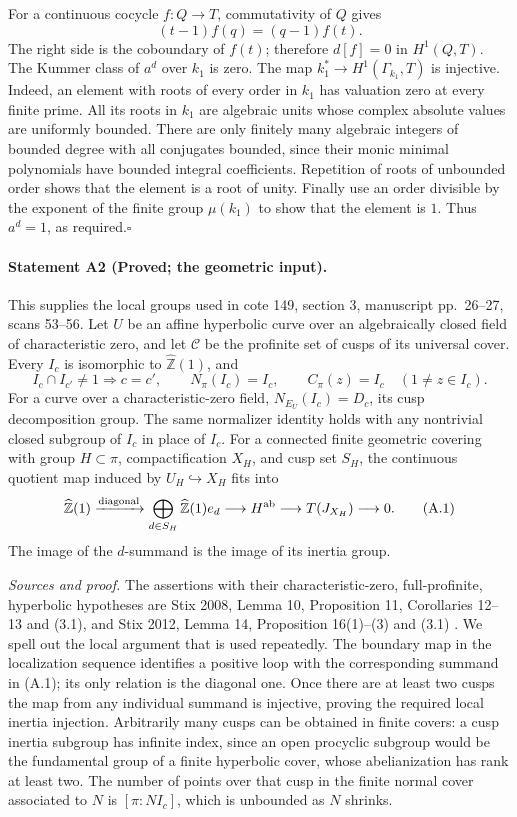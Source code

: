 For a continuous cocycle $f:Q\to T$, commutativity of $Q$ gives
\[
 (t-1)f(q)=(q-1)f(t).
\]
The right side is the coboundary of $f(t)$; therefore $d[f]=0$ in $H^1(Q,T)$. The Kummer class of $a^d$ over $k_1$ is zero. The map $k_1^*\to H^1(\Gamma_{k_1},T)$ is injective. Indeed, an element with roots of every order in $k_1$ has valuation zero at every finite prime. All its roots in $k_1$ are algebraic units whose complex absolute values are uniformly bounded. There are only finitely many algebraic integers of bounded degree with all conjugates bounded, since their monic minimal polynomials have bounded integral coefficients. Repetition of roots of unbounded order shows that the element is a root of unity. Finally use an order divisible by the exponent of the finite group $\mu(k_1)$ to show that the element is $1$. Thus $a^d=1$, as required.\hfill$\square$

\paragraph{Statement A2 (Proved; the geometric input).}\label{res:A2}
This supplies the local groups used in cote 149, section 3, manuscript pp.~26--27, scans 53--56.
Let $U$ be an affine hyperbolic curve over an algebraically closed field of characteristic zero, and let $\mathcal C$ be the profinite set of cusps of its universal cover. Every $I_c$ is isomorphic to $\widehat{\mathbb Z}(1)$, and
\[
 I_c\cap I_{c'}\ne1\Longrightarrow c=c',\qquad
 N_\pi(I_c)=I_c,\qquad C_\pi(z)=I_c\quad(1\ne z\in I_c).
\]
For a curve over a characteristic-zero field, $N_{E_U}(I_c)=D_c$, its cusp decomposition group. The same normalizer identity holds with any nontrivial closed subgroup of $I_c$ in place of $I_c$. For a connected finite geometric covering with group $H\subset\pi$, compactification $X_H$, and cusp set $S_H$, the continuous quotient map induced by $U_H\hookrightarrow X_H$ fits into
\[
 \widehat{\mathbb Z}(1)\xrightarrow{\rm diagonal}
 \bigoplus_{d\in S_H}\widehat{\mathbb Z}(1)e_d
 \longrightarrow H^{\rm ab}\longrightarrow T(J_{X_H})\longrightarrow0.\tag{A.1}
\]
The image of the $d$-summand is the image of its inertia group.

\emph{Sources and proof.} The assertions with their characteristic-zero, full-profinite, hyperbolic hypotheses are Stix 2008, Lemma 10, Proposition 11, Corollaries 12--13 and (3.1), and Stix 2012, Lemma 14, Proposition 16(1)--(3) and (3.1) \cite{Stix2008,Stix2012}. We spell out the local argument that is used repeatedly. The boundary map in the localization sequence identifies a positive loop with the corresponding summand in (A.1); its only relation is the diagonal one. Once there are at least two cusps the map from any individual summand is injective, proving the required local inertia injection. Arbitrarily many cusps can be obtained in finite covers: a cusp inertia subgroup has infinite index, since an open procyclic subgroup would be the fundamental group of a finite hyperbolic cover, whose abelianization has rank at least two. The number of points over that cusp in the finite normal cover associated to $N$ is $[\pi:NI_c]$, which is unbounded as $N$ shrinks.

